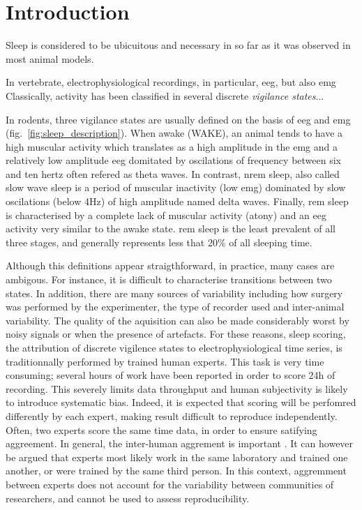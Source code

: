 \section{Introduction} \label{intro}

Sleep is considered to be ubicuitous and necessary in so far as it was observed in most animal models.

In vertebrate, electrophysiological recordings, in particular, \gls{eeg}, but also \gls{emg}
Classically, activity has been classified in several discrete \emph{vigilance states}...

In rodents, three vigilance states are usually defined on the basis of \gls{eeg} and \gls{emg} (fig.~\ref{fig:sleep_description}).
When awake (WAKE), an animal tends to have a high muscular activity which translates as a high amplitude in the \gls{emg} and a relatively low amplitude
\gls{eeg} domitated by oscilations of frequency between six and ten hertz often refered as theta waves.
In contrast, \gls{nrem} sleep, also called slow wave sleep is a period of muscular inactivity (low \gls{emg}) dominated by slow oscilations (below 4Hz) of high amplitude named delta waves.
Finally, \gls{rem} sleep is characterised by a complete lack of muscular activity (atony) and an \gls{eeg} activity very similar to the awake state.
\gls{rem} sleep is the least prevalent of all three stages, and generally represents less that  20\% of all sleeping time.




Although this definitions appear straigthforward, in practice, many cases are ambigous. 
For instance, it is difficult to characterise transitions between two states.
In addition, there are many sources of variability including how surgery was performed by the experimenter,
 the type of recorder used and inter-animal variability.
The quality of the aquisition can also be made considerably worst by noisy  signals or when the presence of artefacts.
For these reasons, sleep scoring, the attribution of discrete vigilence states to electrophysiological time series, is traditionnally performed by trained human experts.
This task is very time consuming; several hours of work have been reported in order to score 24h of recording.
This severely limits data throughput and human subjectivity is likely to introduce systematic bias. 
Indeed, it is expected that scoring will be perfomred differently by each expert, making result difficult to reproduce independently.
Often, two experts score the same time data, in order to ensure satifying aggreement. In general, the inter-human aggrement is important \citationneeded{}.
It can however be argued that experts most likely work in the same laboratory and trained one another, or were trained by the same third person.
In this context, aggremment between experts does not account for the variability between communities of researchers, and cannot be used to assess reproducibility.

